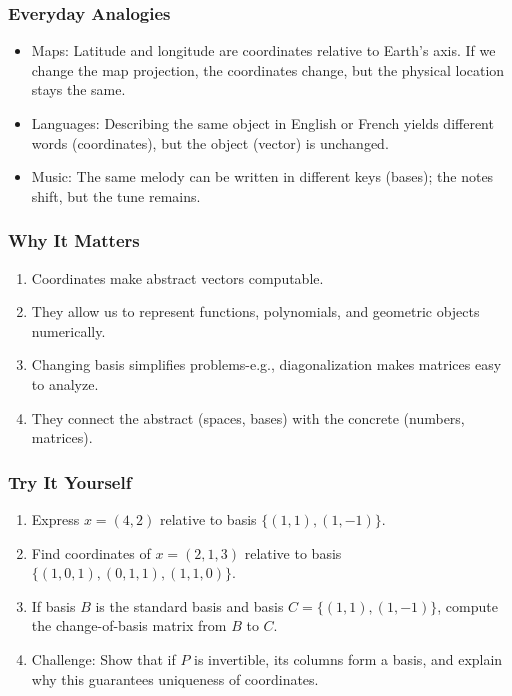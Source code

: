 \documentclass[
  letterpaper,
  DIV=11,
  numbers=noendperiod]{scrreprt}
\providecommand{\tightlist}{%
  \setlength{\itemsep}{0pt}\setlength{\parskip}{0pt}}
\begin{document}
\subsubsection{Everyday Analogies}\label{everyday-analogies-34}

\begin{itemize}
\tightlist
\item
  Maps: Latitude and longitude are coordinates relative to Earth's axis.
  If we change the map projection, the coordinates change, but the
  physical location stays the same.
\item
  Languages: Describing the same object in English or French yields
  different words (coordinates), but the object (vector) is unchanged.
\item
  Music: The same melody can be written in different keys (bases); the
  notes shift, but the tune remains.
\end{itemize}

\subsubsection{Why It Matters}\label{why-it-matters-34}

\begin{enumerate}
\def\labelenumi{\arabic{enumi}.}
\tightlist
\item
  Coordinates make abstract vectors computable.
\item
  They allow us to represent functions, polynomials, and geometric
  objects numerically.
\item
  Changing basis simplifies problems-e.g., diagonalization makes
  matrices easy to analyze.
\item
  They connect the abstract (spaces, bases) with the concrete (numbers,
  matrices).
\end{enumerate}

\subsubsection{Try It Yourself}\label{try-it-yourself-37}

\begin{enumerate}
\def\labelenumi{\arabic{enumi}.}
\tightlist
\item
  Express \(x=(4,2)\) relative to basis \(\{(1,1),(1,-1)\}\).
\item
  Find coordinates of \(x=(2,1,3)\) relative to basis
  \(\{(1,0,1),(0,1,1),(1,1,0)\}\).
\item
  If basis \(B\) is the standard basis and basis \(C=\{(1,1),(1,-1)\}\),
  compute the change-of-basis matrix from \(B\) to \(C\).
\item
  Challenge: Show that if \(P\) is invertible, its columns form a basis,
  and explain why this guarantees uniqueness of coordinates.
\end{enumerate}
\end{document}
